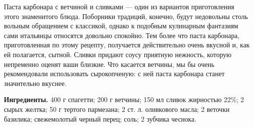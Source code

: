 Паста карбонара с ветчиной и сливками — один из вариантов приготовления этого знаменитого блюда. Поборники традиций, конечно, будут недовольны столь вольным обращением с классикой, однако к подобным кулинарным фантазиям сами итальянцы относятся довольно спокойно. Тем более что паста карбонара, приготовленная по этому рецепту, получается действительно очень вкусной и, как ей полагается, сытной. Сливки придают соусу приятную нежность, которую непременно оценят ваши близкие. Что касается ветчины, мы бы очень рекомендовали использовать сырокопченую: с ней паста карбонара станет значительно вкуснее.

\textbf{Ингредиенты.}
400 г спагетти;
200 г ветчины;
150 мл сливок жирностью 22\%;
2 сырых желтка;
50 г тертого пармезана;
2 ст. л. оливкового масла;
2 веточки базилика;
свежемолотый черный перец;
соль;
2 зубчика чеснока.